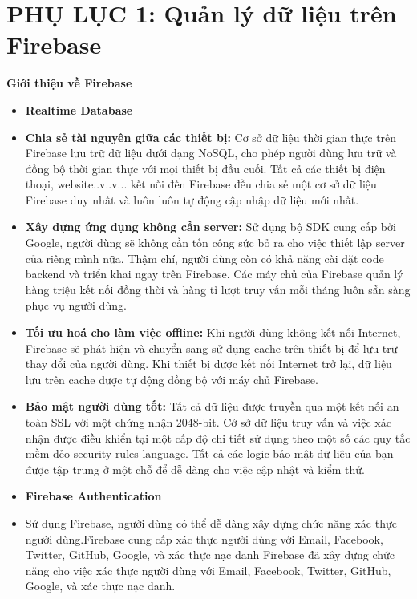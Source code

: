 \ifpdf
    \graphicspath{{Appendix1/}}
\else
    \graphicspath{{Appendix1/}}\fi

\let\svaddcontentsline\addcontentsline
\renewcommand\addcontentsline[3]{%
  \ifthenelse{\equal{#1}{lof}}{}%
  {\ifthenelse{\equal{#1}{lot}}{}{\svaddcontentsline{#1}{#2}{#3}}}}

\chapter{PHỤ LỤC 1: Quản lý dữ liệu trên Firebase	}
{\Large \textbf{Giới thiệu về Firebase }}
\begin{itemize}
	\item \textbf{Realtime Database}
	\item [] \textbf{Chia sẻ tài nguyên giữa các thiết bị: }Cơ sở dữ liệu thời gian thực trên Firebase lưu trữ dữ liệu dưới dạng NoSQL, cho phép người dùng lưu trữ và đồng bộ thời gian thực với mọi thiết bị đầu cuối. Tất cả các thiết bị điện thoại, website..v..v... kết nối đến Firebase đều chia sẻ một cơ sở dữ liệu Firebase duy nhất và luôn luôn tự động cập nhập dữ liệu mới nhất.
	\item [] \textbf{Xây dựng ứng dụng không cần server: }Sử dụng bộ SDK cung cấp bởi Google, người dùng sẽ không cần tốn công sức bỏ ra cho việc thiết lập server của riêng mình nữa. Thậm chí, người dùng còn có khả năng cài đặt code backend và triển khai ngay trên Firebase. Các máy chủ của Firebase quản lý hàng triệu kết nối đồng thời và hàng tỉ lượt truy vấn mỗi tháng luôn sẵn sàng phục vụ người dùng.
	\item [] \textbf{Tối ưu hoá cho làm việc offline: }Khi người dùng không kết nối Internet, Firebase sẽ phát hiện và chuyển sang sử dụng cache trên thiết bị để lưu trữ thay đổi của người dùng. Khi thiết bị được kết nối Internet trở lại, dữ liệu lưu trên cache được tự động đồng bộ với máy chủ Firebase.
	\item[] \textbf{Bảo mật người dùng tốt: }Tất cả dữ liệu được truyền qua một kết nối an toàn SSL với một chứng nhận 2048-bit. Cở sở dữ liệu truy vấn và việc xác nhận  được điều khiển tại một cấp độ chi tiết sử dụng theo một số các quy tắc mềm dẻo security rules language.  Tất cả các logic bảo mật dữ liệu của bạn được tập trung ở một chỗ để dễ dàng cho việc cập nhật và kiểm thử.\\[0.01cm]
	\item \textbf{Firebase Authentication}
	\item [] Sử dụng Firebase, người dùng có thể dễ dàng xây dựng chức năng xác thực người dùng.Firebase cung cấp xác thực người dùng với Email, Facebook, Twitter, GitHub, Google, và xác thực nạc danh Firebase đã xây dựng chức năng cho việc xác thực người dùng với Email, Facebook, Twitter, GitHub, Google, và xác thực nạc danh.\\
\end{itemize}


